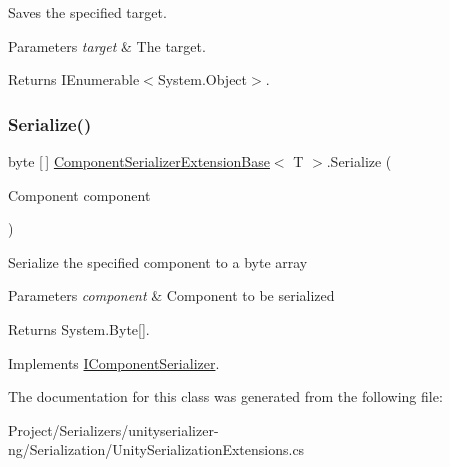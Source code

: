 Saves the specified target. 


\begin{DoxyParams}{Parameters}
{\em target} & The target.\\
\hline
\end{DoxyParams}
\begin{DoxyReturn}{Returns}
I\+Enumerable$<$System.\+Object$>$.
\end{DoxyReturn}
\mbox{\label{class_component_serializer_extension_base_a068c9a1c5f90967de5d22bf9357cfca0}} 
\subsubsection{\texorpdfstring{Serialize()}{Serialize()}}
{\footnotesize\ttfamily byte \mbox{[}$\,$\mbox{]} \hyperlink{class_component_serializer_extension_base}{Component\+Serializer\+Extension\+Base}$<$ T $>$.Serialize (\begin{DoxyParamCaption}\item[{Component}]{component }\end{DoxyParamCaption})\hspace{0.3cm}{\ttfamily [inline]}}



Serialize the specified component to a byte array 


\begin{DoxyParams}{Parameters}
{\em component} & Component to be serialized\\
\hline
\end{DoxyParams}
\begin{DoxyReturn}{Returns}
System.\+Byte\mbox{[}\mbox{]}.
\end{DoxyReturn}


Implements \hyperlink{interface_i_component_serializer_ab2aa38005665496b62d6c54b5f0dbd31}{I\+Component\+Serializer}.



The documentation for this class was generated from the following file\+:\begin{DoxyCompactItemize}
\item 
Project/\+Serializers/unityserializer-\/ng/\+Serialization/Unity\+Serialization\+Extensions.\+cs\end{DoxyCompactItemize}
